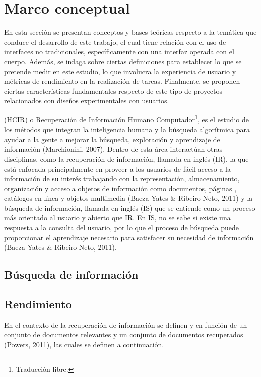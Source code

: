 \section{Marco conceptual}
\label{sec:marco_conceptual}
En esta sección se presentan conceptos y bases teóricas respecto a la temática que conduce el desarrollo de este trabajo, el cual tiene relación con el uso de interfaces no tradicionales, específicamente con una interfaz operada con el cuerpo. Además, se indaga sobre ciertas definiciones para establecer lo que se pretende medir en este estudio, lo que involucra la experiencia de usuario y métricas de rendimiento en la realización de tareas. Finalmente, se proponen ciertas características fundamentales respecto de este tipo de proyectos relacionados con diseños experimentales con usuarios.

 (HCIR) o Recuperación de Información Humano 
Computador\footnote{Traducción libre.}, es el estudio de los métodos que integran la inteligencia humana y la búsqueda algorítmica para ayudar a la gente a mejorar la búsqueda, exploración y aprendizaje de información (Marchionini, 2007). Dentro de esta área interactúan otras disciplinas, como la recuperación de información, llamada en inglés  (IR), la que está enfocada principalmente en proveer a los usuarios de fácil acceso a la información de su interés trabajando con la representación, almacenamiento, organización y acceso a objetos de información como documentos, páginas , catálogos en línea y objetos multimedia (Baeza-Yates & Ribeiro-Neto, 2011) y la búsqueda de información, llamada en inglés  (IS) que se entiende como un proceso más orientado al usuario y abierto que IR. En IS, no se sabe si existe una respuesta a la consulta del usuario, por lo que el proceso de búsqueda puede proporcionar el aprendizaje necesario para satisfacer su necesidad de información (Baeza-Yates & Ribeiro-Neto, 2011). 

\subsection{Búsqueda de información}
\label{subsec:busqueda}

\subsection{Rendimiento}
\label{subsec:rendimiento}
En el contexto de la recuperación de información se definen  y  en función de un conjunto de documentos relevantes y un conjunto de documentos recuperados (Powers, 2011), las cuales se definen a continuación.  

